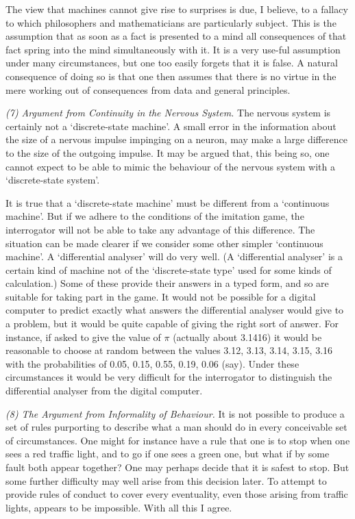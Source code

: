 \documentclass[10pt]{article} %
\begin{document}
The view that machines cannot give rise to surprises is due, I believe, to a fallacy to which philosophers and mathematicians are particularly subject. This is the assumption that as soon as a fact is presented to a mind all consequences of that fact spring into the mind simultaneously with it. It is a very use-ful assumption under many circumstances, but one too easily forgets that it is false. A natural consequence of doing so is that one then assumes that there is no virtue in the mere working out of consequences from data and general principles.
\vspace{0.5\baselineskip} %

\noindent\normalfont \textit{(7) Argument from Continuity in the Nervous System.} The nervous system is certainly not a `discrete-state machine'. A small error in the information about the size of a nervous impulse impinging on a neuron, may make a large difference to the size of the outgoing impulse. It may be argued that, this being so, one cannot expect to be able to mimic the behaviour of the nervous system with a `discrete-state system'.

It is true that a `discrete-state machine' must be different from a `continuous machine'. But if we adhere to the conditions of the imitation game, the interrogator will not be able to take any advantage of this difference. The situation can be made clearer if we consider some other simpler `continuous machine'. A `differential analyser' will do very well. (A `differential analyser' is a certain kind of machine not of the `discrete-state type' used for some kinds of calculation.) Some of these provide their answers in a typed form, and so are suitable for taking part in the game. It would not be possible for a digital computer to predict exactly what answers the differential analyser would give to a problem, but it would be quite capable of giving the right sort of answer. For instance, if asked to give the value of $\pi$ (actually about 3.1416) it would be reasonable to choose at random between the values 3.12, 3.13, 3.14, 3.15, 3.16 with the probabilities of 0.05, 0.15, 0.55, 0.19, 0.06 (say). Under these circumstances it would be very difficult for the interrogator to distinguish the differential analyser from the digital computer.

\vspace{0.5\baselineskip} %
\noindent\normalfont \textit{(8) The Argument from Informality of Behaviour.} It is not possible to produce a set of rules purporting to describe what a man should do in every conceivable set of circumstances. One might for instance have a rule that one is to stop when one sees a red traffic light, and to go if one sees a green one, but what if by some fault both appear together? One may perhaps decide that it is safest to stop. But some further difficulty may well arise from this decision later. To attempt to provide rules of conduct to cover every eventuality, even those arising from traffic lights, appears to be impossible. With all this I agree.
\end{document}
